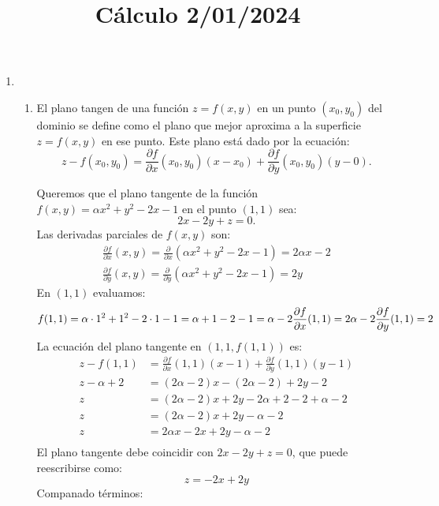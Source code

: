 
\title{Cálculo 2/01/2024}


  \begin{enumerate}[label=\arabic*)]
    \item {}
      \begin{enumerate}[label=\color{red}\alph*)]
        \item {}

          El plano tangen de una función $z=f(x,y)$ en un punto  $(x_0,y_0)$ del dominio se define como el plano que mejor aproxima a la superficie $z=f(x,y)$ en ese punto. Este plano está dado por la ecuación:  \[
          z-f(x_0,y_0)=\frac{\partial f}{\partial x}(x_0,y_0)(x-x_0)+\frac{\partial f}{\partial y} (x_0,y_0)(y-0). 
          \] 

          Queremos que el plano tangente de la función $f(x,y)=\alpha x^2+y^2-2x-1$ en el punto  $(1,1)$ sea:  \[
          2x-2y+z=0.
          \] 
          Las derivadas parciales de $f(x,y)$ son:  \[
          \begin{array}{c}
            \frac{\partial f}{\partial x} (x,y)=\frac{\partial }{\partial x} (\alpha x^2+y^2-2x-1)=2\alpha x-2\\
            \frac{\partial f}{\partial y} (x,y)=\frac{\partial }{\partial y} (\alpha x^2+y^2-2x-1)=2y
          \end{array}
          \] 
          En $(1,1)$ evaluamos:  \[
          f(1,1)=\alpha\cdot 1^2+1^2-2\cdot 1-1=\alpha+1-2-1=\alpha-2\\
          \frac{\partial f}{\partial x} (1,1)=2\alpha-2\\
          \frac{\partial f}{\partial y} (1,1)=2
          \] 
          La ecuación del plano tangente en $(1,1,f(1,1))$ es:  \[
            \begin{aligned} 
              z-f(1,1)&=\frac{\partial f}{\partial x} (1,1)(x-1)+\frac{\partial f}{\partial y} (1,1)(y-1)\\
              z-\alpha+2&=(2\alpha-2)x - (2\alpha-2) +2y-2\\
              z&=(2\alpha-2)x+2y-2\alpha+2-2+\alpha-2\\
              z&=(2\alpha-2)x+2y-\alpha-2\\
              z&= 2\alpha x-2x+2y-\alpha-2 \\
            \end{aligned}
          \] 
          El plano tangente debe coincidir con $2x-2y+z=0$, que puede reescribirse como:  \[
          z=-2x+2y
          \] 
          Companado términos:


\end{enumerate}
\end{enumerate}

